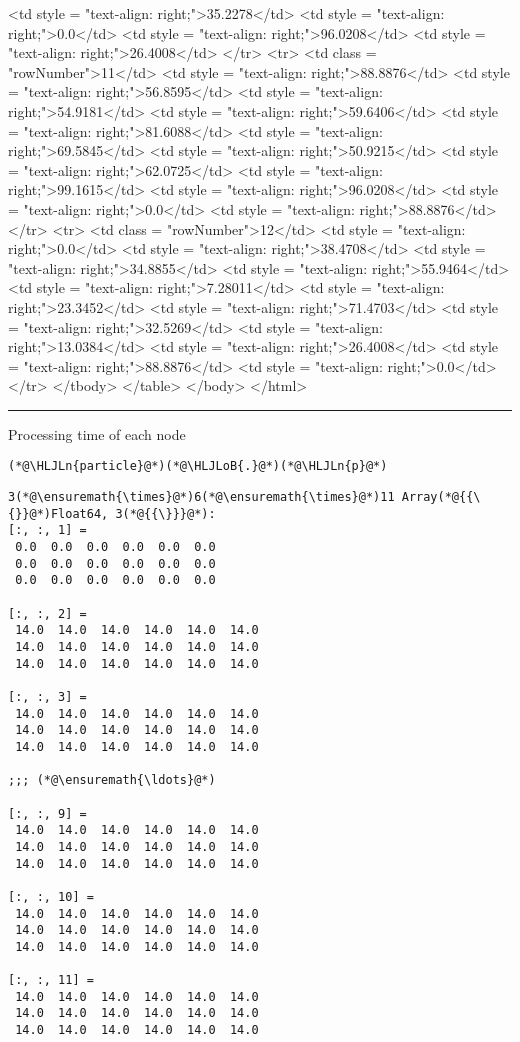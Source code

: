 \documentclass[12pt,a4paper]{article}
\newcommand{\HLJLn}[1]{#1}
\newcommand{\HLJLoB}[1]{\textcolor[RGB]{102,102,102}{\textbf{#1}}}
\begin{document}
      <td style = "text-align: right;">35.2278</td>
      <td style = "text-align: right;">0.0</td>
      <td style = "text-align: right;">96.0208</td>
      <td style = "text-align: right;">26.4008</td>
    </tr>
    <tr>
      <td class = "rowNumber">11</td>
      <td style = "text-align: right;">88.8876</td>
      <td style = "text-align: right;">56.8595</td>
      <td style = "text-align: right;">54.9181</td>
      <td style = "text-align: right;">59.6406</td>
      <td style = "text-align: right;">81.6088</td>
      <td style = "text-align: right;">69.5845</td>
      <td style = "text-align: right;">50.9215</td>
      <td style = "text-align: right;">62.0725</td>
      <td style = "text-align: right;">99.1615</td>
      <td style = "text-align: right;">96.0208</td>
      <td style = "text-align: right;">0.0</td>
      <td style = "text-align: right;">88.8876</td>
    </tr>
    <tr>
      <td class = "rowNumber">12</td>
      <td style = "text-align: right;">0.0</td>
      <td style = "text-align: right;">38.4708</td>
      <td style = "text-align: right;">34.8855</td>
      <td style = "text-align: right;">55.9464</td>
      <td style = "text-align: right;">7.28011</td>
      <td style = "text-align: right;">23.3452</td>
      <td style = "text-align: right;">71.4703</td>
      <td style = "text-align: right;">32.5269</td>
      <td style = "text-align: right;">13.0384</td>
      <td style = "text-align: right;">26.4008</td>
      <td style = "text-align: right;">88.8876</td>
      <td style = "text-align: right;">0.0</td>
    </tr>
  </tbody>
</table>
</body>
</html>


\rule{\textwidth}{1pt}
Processing time of each node


\begin{lstlisting}
(*@\HLJLn{particle}@*)(*@\HLJLoB{.}@*)(*@\HLJLn{p}@*)
\end{lstlisting}

\begin{lstlisting}
3(*@\ensuremath{\times}@*)6(*@\ensuremath{\times}@*)11 Array(*@{{\{}}@*)Float64, 3(*@{{\}}}@*):
[:, :, 1] =
 0.0  0.0  0.0  0.0  0.0  0.0
 0.0  0.0  0.0  0.0  0.0  0.0
 0.0  0.0  0.0  0.0  0.0  0.0

[:, :, 2] =
 14.0  14.0  14.0  14.0  14.0  14.0
 14.0  14.0  14.0  14.0  14.0  14.0
 14.0  14.0  14.0  14.0  14.0  14.0

[:, :, 3] =
 14.0  14.0  14.0  14.0  14.0  14.0
 14.0  14.0  14.0  14.0  14.0  14.0
 14.0  14.0  14.0  14.0  14.0  14.0

;;; (*@\ensuremath{\ldots}@*) 

[:, :, 9] =
 14.0  14.0  14.0  14.0  14.0  14.0
 14.0  14.0  14.0  14.0  14.0  14.0
 14.0  14.0  14.0  14.0  14.0  14.0

[:, :, 10] =
 14.0  14.0  14.0  14.0  14.0  14.0
 14.0  14.0  14.0  14.0  14.0  14.0
 14.0  14.0  14.0  14.0  14.0  14.0

[:, :, 11] =
 14.0  14.0  14.0  14.0  14.0  14.0
 14.0  14.0  14.0  14.0  14.0  14.0
 14.0  14.0  14.0  14.0  14.0  14.0
\end{lstlisting}
\end{document}

